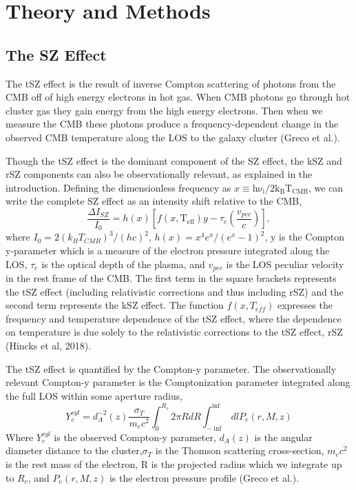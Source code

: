 \documentclass{princeton_astro_thesis}
\begin{document}
 \chapter{Theory and Methods}
\section{The SZ Effect}
The tSZ effect is the result of inverse Compton scattering of photons from the CMB off of high energy electrons in hot gas. When CMB photons go through hot cluster gas they gain energy from the high energy electrons. Then when we measure the CMB these photons produce a frequency-dependent change in the observed CMB temperature along the LOS to the galaxy cluster (Greco et al.). 
\par Though the tSZ effect is the dominant component of the SZ effect, the kSZ and rSZ components can also be observationally relevant, as explained in the introduction. Defining the dimensionless frequency as $x\equiv \mathrm{h\nu_i/2k_B T_{CMB}}$, we can write the complete SZ effect as an intensity shift relative to the CMB,
\begin{equation}
\frac{\Delta I_{SZ}}{I_0}=h(x)\left[f(x,\mathrm{T_{eff}})y-\tau_{e}\left(\frac{v_{pec}}{c}\right)\right],
\end{equation}
where $I_0=2(k_B T_{CMB})^3/(hc)^2$, $h(x)=x^4 e^x/(e^x-1)^2$, y is the Compton y-parameter which is a measure of the electron pressure integrated along the LOS, $\tau_e$ is the optical depth of the plasma, and $v_{pec}$ is the LOS peculiar velocity in the rest frame of the CMB. The first term in the square brackets represents the tSZ effect (including relativistic corrections and thus including rSZ) and the second term represents the kSZ effect. The function $f(x,T_{eff})$ expresses the frequency and temperature dependence of the tSZ effect, where the dependence on temperature is due solely to the relativistic corrections to the tSZ effect, rSZ (Hincks et al, 2018).
\par The tSZ effect is quantified by the Compton-y parameter. The observationally relevant Compton-y parameter is the Comptonization parameter integrated along the full LOS within some aperture radius,
\begin{equation}
Y^{cyl}_{c}=d^{-2}_A(z) \frac{\sigma_T}{m_e c^2}\int_0^{R_c} 2 \pi R dR \int_{-\inf}^{\inf} dl P_e(r,M,z)
\end{equation}
Where $Y^{cyl}_{c}$ is the observed Compton-y parameter, $d_A(z)$ is the angular diameter distance to the cluster,$\sigma_T$ is the Thomson scattering cross-section, $m_e c^2$ is the rest mass of the electron, R is the  projected radius which we integrate up to $R_c$,  and $P_e(r,M,z)$ is the electron pressure profile (Greco et al.).
\end{document}
